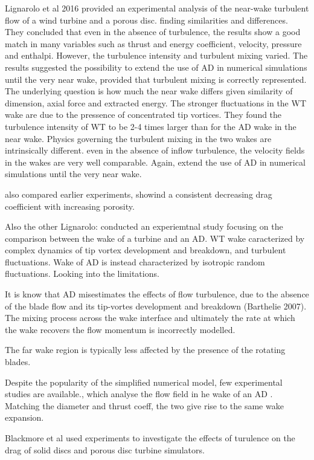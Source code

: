 Lignarolo et al 2016 \cite{Lignarolo2016} provided an experimental analysis of the near-wake turbulent flow of a wind turbine and a porous disc. finding similarities and differences. They concluded that even in the absence of turbulence, the results show a good match in many variables such as thrust and energy coefficient, velocity, pressure and enthalpi. However, the turbulence intensity and turbulent mixing varied. The results suggested the possibility to extend the use of AD in numerical simulations until the very near wake, provided that turbulent mixing is correctly represented. The underlying question is how much the near wake differs given similarity of dimension, axial force and extracted energy. The stronger fluctuations in the WT wake are due to the pressence of concentrated tip vortices. They found the turbulence intensity of WT to be 2-4 times larger than for the AD wake in the near wake. Physics governing the turbulent mixing in the two wakes are intrinsically different. even in the absence of inflow turbulence, the velocity fields in the wakes are very well comparable. Again, extend the use of AD in numerical simulations until the very near wake. 

\cite{Lignarolo2016} also compared earlier experiments, showind a consistent decreasing drag coefficient with increasing porosity. 

Also the other Lignarolo: \cite{Lignarolo2014} conducted an experiemtnal study focusing on the comparison between the wake of a turbine and an AD. WT wake caracterized by complex dynamics of tip vortex development and breakdown, and turbulent fluctuations. Wake of AD is instead characterized by isotropic random fluctuations. Looking into the limitations. 

It is know that AD misestimates the effects of flow turbulence, due to the absence of the blade flow and its tip-vortes development and breakdown (Barthelie 2007). The mixing process across the wake interface and ultimately the rate at which the wake recovers the flow momentum is incorrectly modelled. 

The far wake region is typically less affected by the presence of the rotating blades. 

Despite the popularity of the simplified numerical model, few experimental studies are available., which analyse the flow field in he wake of an AD \cite{Lignarolo2014}. Matching the diameter and thrust coeff, the two give rise to the same wake expansion. 


Blackmore et al \cite{Blackmore2013} used experiments to investigate the effects of turulence on the drag of solid discs and porous disc turbine simulators. 

